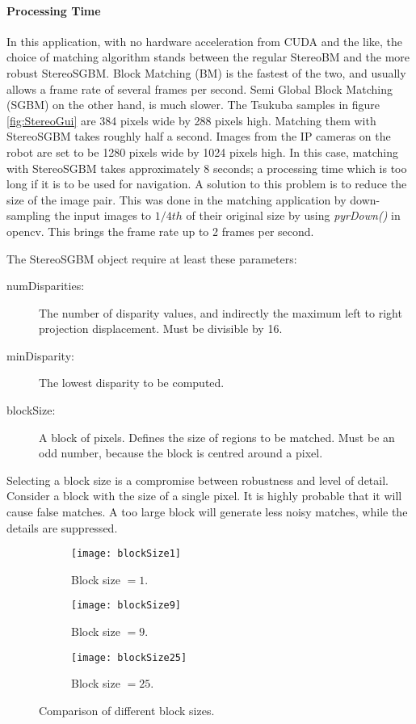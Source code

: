 \paragraph{Processing Time}
In this application, with no hardware acceleration from CUDA and the like, the choice of matching algorithm stands between the regular StereoBM and the more robust StereoSGBM. Block Matching (BM) is the fastest of the two, and usually allows a frame rate of several frames per second. Semi Global Block Matching (SGBM) on the other hand, is much slower. The Tsukuba samples in figure \ref{fig:StereoGui} are 384 pixels wide by 288 pixels high. Matching them with StereoSGBM takes roughly half a second. Images from the IP cameras on the robot are set to be 1280 pixels wide by 1024 pixels high. In this case, matching with StereoSGBM takes approximately 8 seconds; a processing time which is too long if it is to be used for navigation. A solution to this problem is to reduce the size of the image pair. This was done in the matching application by down-sampling the input images to $1/4th$ of their original size by using \textit{pyrDown()} in \gls{opencv}. This brings the frame rate up to 2 frames per second.

The StereoSGBM object require at least these parameters:

 \begin{description}
 	\item[numDisparities: ] The number of disparity values, and indirectly the maximum left to right projection displacement. Must be divisible by 16.
 	\item[minDisparity: ] The lowest disparity to be computed.
	\item[blockSize: ] A block of pixels. Defines the size of regions to be matched. Must be an odd number, because the block is centred around a pixel.
\end{description}

Selecting a block size is a compromise between robustness and level of detail. Consider a block with the size of a single pixel. It is highly probable that it will cause false matches. A too large block will generate less noisy matches, while the details are suppressed.

\begin{figure}
	\centering
	\begin{subfigure}[b]{0.30\textwidth}
		\texttt{[image: blockSize1]}
		\caption{Block size $= 1$.}
		\label{fig:block1}
	\end{subfigure}
	\begin{subfigure}[b]{0.30\textwidth}
		\texttt{[image: blockSize9]}
		\caption{Block size $= 9$.}
		\label{fig:block9}
	\end{subfigure}
	\begin{subfigure}[b]{0.30\textwidth}
		\texttt{[image: blockSize25]}
		\caption{Block size $= 25$.}
		\label{fig:block21}
	\end{subfigure}
	\caption{\label{fig:blockSize}Comparison of different block sizes.}
\end{figure}


